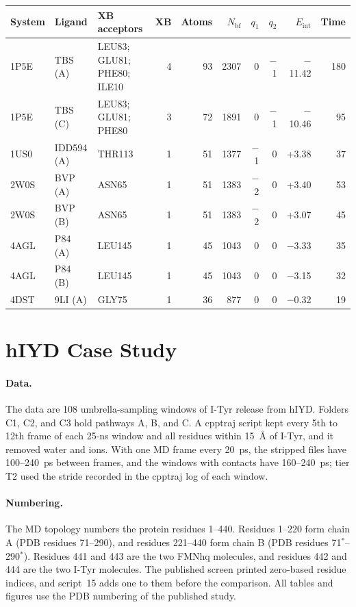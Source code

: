 \documentclass[journal=jcisd8,manuscript=suppinfo]{achemso}
\begin{document}
\begin{singlespace}
\begin{table}[!htbp]
\begin{tabular}{lllrrrrrrr}\toprule System & Ligand & XB acceptors & XB & Atoms & $N_\mathrm{bf}$ & $q_1$ & $q_2$ & $E_\mathrm{int}$ & Time\\\midrule
1P5E & TBS (A) & LEU83; GLU81; PHE80; ILE10 & 4 & 93 & 2307 & 0 & $-$1 & $-$11.42 & 180\\
1P5E & TBS (C) & LEU83; GLU81; PHE80 & 3 & 72 & 1891 & 0 & $-$1 & $-$10.46 & 95\\
1US0 & IDD594 (A) & THR113 & 1 & 51 & 1377 & $-$1 & 0 & +3.38 & 37\\
2W0S & BVP (A) & ASN65 & 1 & 51 & 1383 & $-$2 & 0 & +3.40 & 53\\
2W0S & BVP (B) & ASN65 & 1 & 51 & 1383 & $-$2 & 0 & +3.07 & 45\\
4AGL & P84 (A) & LEU145 & 1 & 45 & 1043 & 0 & 0 & $-$3.33 & 35\\
4AGL & P84 (B) & LEU145 & 1 & 45 & 1043 & 0 & 0 & $-$3.15 & 32\\
4DST & 9LI (A) & GLY75 & 1 & 36 & 877 & 0 & 0 & $-$0.32 & 19\\
\bottomrule\end{tabular}\end{table}

\section{hIYD Case Study}
\label{sec:hiydesi}

\paragraph{Data.} The data are 108 umbrella-sampling windows of I-Tyr release from hIYD.\cite{Karmakar2026} Folders C1, C2, and C3 hold pathways A, B, and C. A cpptraj\cite{RoeCheatham2013} script kept every 5th to 12th frame of each 25-ns window and all residues within \SI{15}{\angstrom} of I-Tyr, and it removed water and ions. With one MD frame every 20~ps, the stripped files have 100--240~ps between frames, and the windows with contacts have 160--240~ps; tier T2 used the stride recorded in the cpptraj log of each window.

\paragraph{Numbering.} The MD topology numbers the protein residues 1--440. Residues 1--220 form chain A (PDB residues 71--290), and residues 221--440 form chain B (PDB residues 71$^{*}$--290$^{*}$). Residues 441 and 443 are the two FMNhq molecules, and residues 442 and 444 are the two I-Tyr molecules. The published screen printed zero-based residue indices, and script~15 adds one to them before the comparison. All tables and figures use the PDB numbering of the published study.


\end{singlespace}
\end{document}
